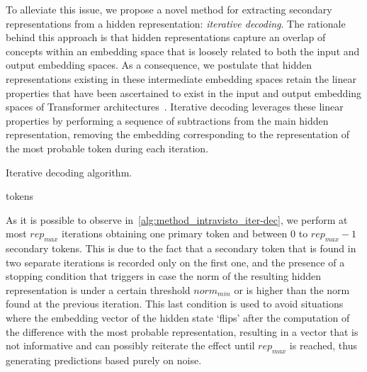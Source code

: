 To alleviate this issue, we propose a novel method for extracting secondary representations from a hidden representation: \emph{iterative decoding}.
The rationale behind this approach is that hidden representations capture an overlap of concepts within an embedding space that is loosely related to both the input and output embedding spaces.
As a consequence, we postulate that hidden representations existing in these intermediate embedding spaces retain the linear properties that have been ascertained to exist in the input and output embedding spaces of Transformer architectures~\cite{mikolov2013,park2023}.
Iterative decoding leverages these linear properties by performing a sequence of subtractions from the main hidden representation, removing the embedding corresponding to the representation of the most probable token during each iteration.

\begin{algorithm}
    \caption{Iterative decoding algorithm.}\label{alg:method_intravisto_iter-dec}
    \begin{algorithmic}
            \ENDIF{}
            \ENDIF{}
        \ENDWHILE{}
        \RETURN tokens
    \end{algorithmic}
\end{algorithm}

As it is possible to observe in~\cref{alg:method_intravisto_iter-dec}, we perform at most ${rep}_{max}$ iterations obtaining one primary token and between $0$ to ${rep}_{max} - 1$ secondary tokens.
This is due to the fact that a secondary token that is found in two separate iterations is recorded only on the first one, and the presence of a stopping condition that triggers in case the norm of the resulting hidden representation is under a certain threshold ${norm}_{min}$ or is higher than the norm found at the previous iteration.
This last condition is used to avoid situations where the embedding vector of the hidden state `flips' after the computation of the difference with the most probable representation, resulting in a vector that is not informative and can possibly reiterate the effect until ${rep}_{max}$ is reached, thus generating predictions based purely on noise.

